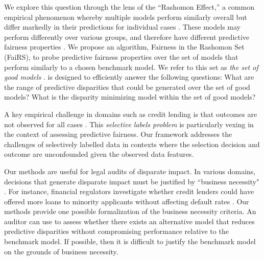 \documentclass{article}
\begin{document}

We explore this question through the lens of the ``Rashomon Effect,'' a common empirical phenomenon whereby multiple models perform similarly overall but differ markedly in their predictions for individual cases \cite{Breiman(01)}. These models may perform differently over various groups, and therefore have different predictive fairness properties \cite{ChouldechovaGsell(17)}. We propose an algorithm, Fairness in the Rashomon Set (FaiRS), to probe predictive fairness properties over the set of models that perform similarly to a chosen benchmark model. We refer to this set as \textit{the set of good models} \cite{DongRudin(20)}. \fairs is designed to efficiently answer the following questions: What are the range of predictive disparities that could be generated over the set of good models? What is the disparity minimizing model within the set of good models?

A key empirical challenge in domains such as credit lending is that outcomes are not observed for all cases \cite{lakkaraju2017selective, kleinberg2018human}. 
This \emph{selective labels problem} is particularly vexing in the context of assessing predictive fairness. Our framework addresses the challenges of selectively labelled data in contexts where the selection decision and outcome are unconfounded given the observed data features.

Our methods are useful for legal audits of disparate impact. In various domains, decisions that generate disparate impact must be justified by ``business necessity" \cite{civil-rights-act, ECOA, BarocasSelbst2016}. For instance, financial regulators investigate whether credit lenders could have offered more loans to minority applicants without affecting default rates \cite{gillis}.
Our methods provide one possible formalization of the business necessity criteria.
An auditor can use \fairs to assess whether there exists an alternative model that reduces predictive disparities without compromising performance relative to the benchmark model. If possible, then it is difficult to justify the benchmark model on the grounds of business necessity.
\end{document}
